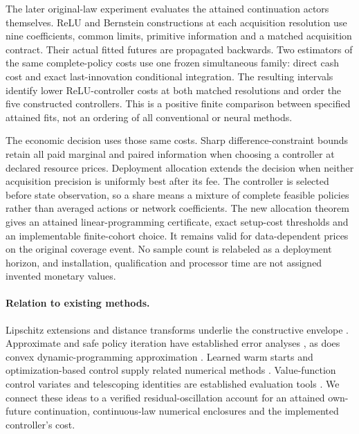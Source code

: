 \documentclass[ecta,nameyear,draft]{econsocart}
\begin{document}
The later original-law experiment evaluates the attained continuation actors themselves. ReLU and Bernstein constructions at each acquisition resolution use nine coefficients, common limits, primitive information and a matched acquisition contract. Their actual fitted futures are propagated backwards. Two estimators of the same complete-policy costs use one frozen simultaneous family: direct cash cost and exact last-innovation conditional integration. The resulting intervals identify lower ReLU-controller costs at both matched resolutions and order the five constructed controllers. This is a positive finite comparison between specified attained fits, not an ordering of all conventional or neural methods.

The economic decision uses those same costs. Sharp difference-constraint bounds retain all paid marginal and paired information when choosing a controller at declared resource prices. Deployment allocation extends the decision when neither acquisition precision is uniformly best after its fee. The controller is selected before state observation, so a share means a mixture of complete feasible policies rather than averaged actions or network coefficients. The new allocation theorem gives an attained linear-programming certificate, exact setup-cost thresholds and an implementable finite-cohort choice. It remains valid for data-dependent prices on the original coverage event. No sample count is relabeled as a deployment horizon, and installation, qualification and processor time are not assigned invented monetary values.

\paragraph{Relation to existing methods.}
Lipschitz extensions and distance transforms underlie the constructive envelope \citep{mcshane1934,felzenszwalb2012}. Approximate and safe policy iteration have established error analyses \citep{munos2003,pirotta2013,scherrer2015}, as does convex dynamic-programming approximation \citep{yang2020convex}. Learned warm starts and optimization-based control supply related numerical methods \citep{sakaue2023warm,sambharya2023,agrawal2020control}. Value-function control variates and telescoping identities are established evaluation tools \citep{munos2006variance,jiang2016}. We connect these ideas to a verified residual-oscillation account for an attained own-future continuation, continuous-law numerical enclosures and the implemented controller's cost.
\end{document}
